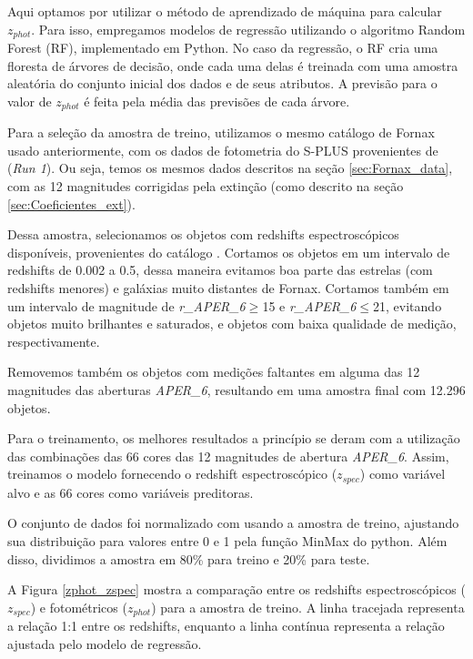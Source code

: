 Aqui optamos por utilizar o método de aprendizado de máquina para calcular \textit{$z_{phot}$}. Para isso, empregamos modelos de regressão utilizando o algoritmo Random Forest (RF), implementado em Python. No caso da regressão, o RF cria uma floresta de árvores de decisão, onde cada uma delas é treinada com uma amostra aleatória do conjunto inicial dos dados e de seus atributos. A previsão para o valor de \textit{$z_{phot}$} é feita pela média das previsões de cada árvore.

Para a seleção da amostra de treino, utilizamos o mesmo catálogo de Fornax usado anteriormente, com os dados de fotometria do S-PLUS provenientes de \cite{haack2024splusfornaxprojectsfp} (\textit{Run 1}). Ou seja, temos os mesmos dados descritos na seção \ref{sec:Fornax_data}, com as 12 magnitudes corrigidas pela extinção (como descrito na seção \ref{sec:Coeficientes_ext}).

Dessa amostra, selecionamos os objetos com redshifts espectroscópicos disponíveis, provenientes do catálogo \cite{Lima_2024}. Cortamos os objetos em um intervalo de redshifts de 0.002 a 0.5, dessa maneira evitamos boa parte das estrelas (com redshifts menores) e galáxias muito distantes de Fornax. Cortamos também em um intervalo de magnitude de \textit{r\_APER\_6}$\geq$15 e \textit{r\_APER\_6}$\leq$21, evitando objetos muito brilhantes e saturados, e objetos com baixa qualidade de medição, respectivamente.

Removemos também os objetos com medições faltantes em alguma das 12 magnitudes das aberturas \textit{APER\_6}, resultando em uma amostra final com 12.296 objetos.

Para o treinamento, os melhores resultados a princípio se deram com a utilização das combinações das 66 cores das 12 magnitudes de abertura \textit{APER\_6}. Assim, treinamos o modelo fornecendo o redshift espectroscópico (\textit{$z_{spec}$}) como variável alvo e as 66 cores como variáveis preditoras.


O conjunto de dados foi normalizado com usando a amostra de treino, ajustando sua distribuição para valores entre 0 e 1 pela função MinMax do python. Além disso, dividimos a amostra em 80\% para treino e 20\% para teste.

A Figura \ref{zphot_zspec} mostra a comparação entre os redshifts espectroscópicos (\textit{$z_{spec}$}) e fotométricos (\textit{$z_{phot}$}) para a amostra de treino. A linha tracejada representa a relação 1:1 entre os redshifts, enquanto a linha contínua representa a relação ajustada pelo modelo de regressão.

